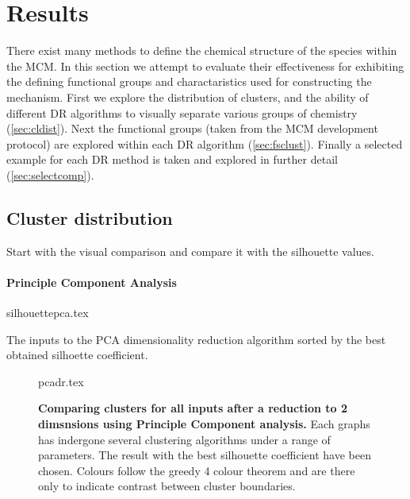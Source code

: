 \section{Results}\label{sec:drres}
% 
There exist many methods to define the chemical structure of the species within the MCM. In this section we attempt to evaluate their effectiveness for exhibiting the defining functional groups and charactaristics used for constructing the mechanism. First we explore the distribution of clusters, and the ability of different DR algorithms to visually separate various groups of chemistry (\autoref{sec:cldist}). Next the functional groups (taken from the MCM development protocol) are explored within each DR algorithm (\autoref{sec:fsclust}). Finally a selected example for each DR method is taken and explored in further detail (\autoref{sec:selectcomp}).

\subsection{Cluster distribution}\label{sec:cldist}

Start with the visual comparison and compare it with the silhouette values. 




\paragraph*{Principle Component Analysis}


\begin{table}[H]
    \centering
        {silhouettepca.tex}
        \caption{The inputs to the PCA dimensionality reduction algorithm sorted by the best obtained silhoette coefficient.  }
        \label{tab:pcasil}
\end{table}



\begin{landscape}
\begin{figure}[H]
    {pcadr.tex}
    \caption{\textbf{Comparing clusters for all inputs after a reduction to 2 dimsnsions using Principle Component analysis.}
    Each graphs has indergone several clustering algorithms under a range of parameters. The result with the best silhouette coefficient have been chosen. Colours follow the greedy 4 colour theorem and are there only to indicate contrast between cluster boundaries.}
    \label{fig:pcavis}
\end{figure}
\end{landscape}






